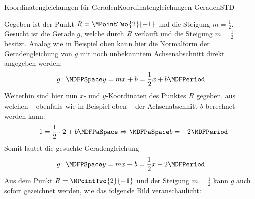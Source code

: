 \begin{MXContent}{Koordinatengleichungen für Geraden}{Koordinatengleichungen Geraden}{STD}
\begin{MExample}
Gegeben ist der Punkt $R=\MPointTwo{2}{-1}$ und die Steigung $m=\frac{1}{2}$. Gesucht ist die Gerade $g$, welche durch $R$ verläuft und die Steigung $m=\frac{1}{2}$ besitzt. Analog wie in Beispiel  oben kann hier die Normalform der Geradengleichung von $g$ mit noch unbekanntem Achsenabschnitt direkt angegeben werden:
\[
 g\colon\MDFPSpace y=m x+b=\frac{1}{2}x+b\MDFPeriod
\]
Weiterhin sind hier nun $x$- und $y$-Koordinaten des Punktes $R$ gegeben, aus welchen -- ebenfalls wie in Beispiel  oben -- der Achsenabschnitt $b$ berechnet werden kann:
\[
 -1=\frac{1}{2}\cdot 2 + b\MDFPaSpace\Leftrightarrow\MDFPaSpace b=-2\MDFPeriod
\]
Somit lautet die gesuchte Geradengleichung
\[
 g\colon\MDFPSpace y=m x+b=\frac{1}{2}x-2\MDFPeriod
\]
Aus dem Punkt $R=\MPointTwo{2}{-1}$ und der Steigung $m=\frac{1}{2}$ kann $g$ auch sofort gezeichnet werden, wie das folgende Bild veranschaulicht:
  \begin{center}
\end{center} 
\end{MExample}


\end{MXContent}
